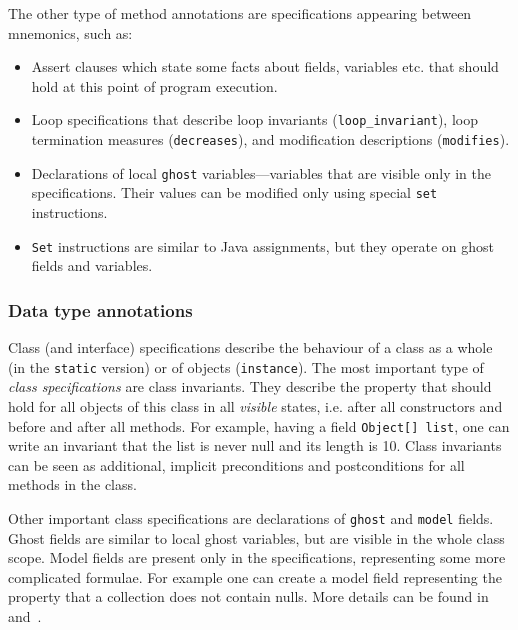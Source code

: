 \documentclass{llncs}
\newcommand{\hs}{\hspace{0.5pt}}
\begin{document}
The other type of method annotations are specifications 
appearing between mnemonics, such as:
\begin{itemize}
\item {Assert clauses which state some facts about fields,
  variables etc. that should hold at this point of program execution.}
\item {Loop specifications that describe loop invariants
    (\texttt{loop\_invariant}), loop termination measures
    (\texttt{decreases}), and modification descriptions (\texttt{modifies}).}
\item {Declarations of local \texttt{ghost}
  variables\hs{}---\hs{}variables that are visible only in the
  specifications. Their values can be modified only using special
  \texttt{set} instructions.}
\item {\texttt{Set} instructions are similar to Java assignments, but
  they operate on ghost fields and variables.}
\end{itemize}

\vspace{-\baselineskip}

\subsubsection{Data type annotations}
Class (and interface) specifications describe the behaviour of a class
as a whole (in the \texttt{static} version) or of objects
(\texttt{instance}). The most important type of \textit{class
specifications} are class invariants. They describe the property that
should hold for all objects of this class in all \textit{visible}
states, i.e. after all constructors and before and after all
methods. For example, having a field \texttt{Object[] list}, one can
write an invariant that the list is never null and its length is
10. Class invariants can be seen as additional, implicit preconditions
and postconditions for all methods in the class.

Other important class specifications are declarations of \texttt{ghost} and \texttt{model} fields. Ghost fields are similar to
  local ghost variables, but are visible in the whole class scope. Model fields are present only in the specifications,
  representing some more complicated formulae. For example one can
  create a model field representing the property that a collection does
  not contain nulls.
More details can be found in~\cite{jmlrefman} and~\cite{bmlrefman}.
\end{document}
